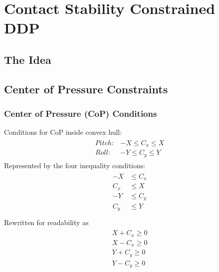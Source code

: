 
\chapter{Contact Stability Constrained DDP}\label{c3}
\section{The Idea}

\section{Center of Pressure Constraints}
\subsection{Center of Pressure (CoP) Conditions}
Conditions for \gls{CoP} inside convex hull:
\begin{align}
\begin{split}
Pitch:& -X \leq C_x \leq X \\
Roll:& -Y \leq C_y \leq Y
\end{split}
\end{align}
Represented by the four inequality conditions:
\begin{align*}
\begin{split}
-X &\leq C_x \\
C_x &\leq X \\
-Y &\leq C_y \\
C_y &\leq Y \\
\end{split}
\end{align*}
Rewritten for readability as
\begin{align}
\begin{split}
X + C_x \geq 0 \\
X - C_x \geq 0 \\
Y + C_y \geq 0 \\
Y - C_y \geq 0 \\
\end{split}
\end{align}

